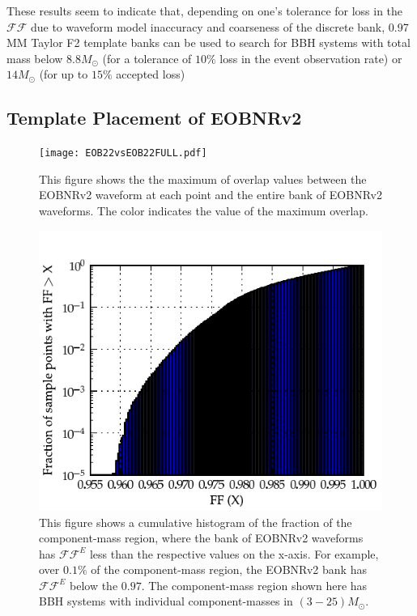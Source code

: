 \documentclass[aps,
prd,
amsmath,
amssymb,
twocolumn,
floatfix,
groupedaddress]{revtex4-1}
\newcommand{\FF}{\mathcal{FF}}
\newcommand{\MM}{\mathrm{MM}}
\begin{document}
These results seem to indicate that, depending on one's tolerance for loss in the $\FF$ due to waveform model inaccuracy and coarseness of the discrete bank, 0.97$\MM$ Taylor F2 template banks can be used to search for BBH systems with total mass below $8.8M_{\odot}$ (for a tolerance of $10\%$ loss in the event observation rate) or $14M_{\odot}$ (for up to $15\%$ accepted loss)

\subsection{Template Placement of EOBNRv2}\label{sec:level2:EOBNRv2templateplacement}
\begin{figure}
\centering
\texttt{[image: EOB22vsEOB22FULL.pdf]}
\caption{\label{fig:match_eobeob_all}This figure shows the the maximum of overlap values between the EOBNRv2 waveform at each point and the entire bank of EOBNRv2 waveforms. The color indicates the value of the maximum overlap.}
\end{figure}
\begin{figure}
\centering
\includegraphics[scale=0.04, clip=false, totalheight=0.3\textheight, width=\columnwidth]{EOB22vsEOB22FULLcumhist.pdf}
\caption{\label{fig:cumhist_eobeob_all}This figure shows a cumulative histogram of the fraction of the component-mass region, where the bank of EOBNRv2 waveforms has $\mathcal{FF}^E$ less than the respective values on the x-axis. For example, over $0.1\%$ of the component-mass region, the EOBNRv2 bank has $\mathcal{FF}^E$ below the $0.97$. The component-mass region shown here has BBH systems with individual component-masses in $(3-25)M_{\odot}$.}
\end{figure} 
\end{document}
